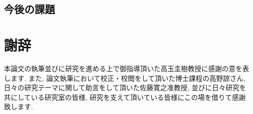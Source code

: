 \documentclass[a4j,11pt]{jarticle}
\def\proposed{DNRBA}
\begin{document}
\subsection{今後の課題}
\label{ss:END_future}


\clearpage
\pagestyle{plain}
\section*{謝辞}
本論文の執筆並びに研究を進める上で御指導頂いた高玉圭樹教授に感謝の意を表します. 
また, 論文執筆において校正・校閲をして頂いた博士課程の高野諒さん, 日々の研究テーマに関して助言をして頂いた佐藤寛之准教授, 並びに日々研究を共にしている研究室の皆様, 研究を支えて頂いている皆様にこの場を借りて感謝致します. 
\end{document}
